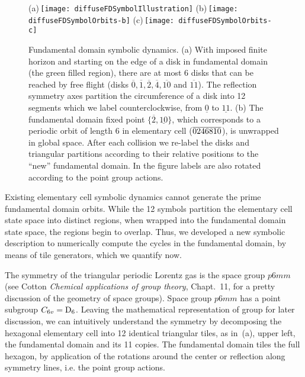 \begin{figure}[htbp]
  (a)\,\texttt{[image: diffuseFDSymbolIllustration]}
  (b)\,\texttt{[image: diffuseFDSymbolOrbits-b]}
  (c)\,\texttt{[image: diffuseFDSymbolOrbits-c]}
  \caption{\label{fig-fdflights}
  Fundamental domain symbolic dynamics.
  (a) With  imposed finite horizon and starting on the edge of a disk in
  fundamental  domain (the green filled region), there are at most 6
  disks that can be reached by free flight (disks
  $\overline{0},\overline{1},\overline{2},\overline{4},\overline{10}$ and
  $\overline{11}$).
  The reflection symmetry axes partition the circumference of
  a disk into 12 segments which we
  label counterclockwise, from $\underline{0}$ to $\underline{11}$. 
  (b) The fundamental domain fixed point
  $\{\overline{2},\underline{10}\}$, which corresponds to a periodic
  orbit of length 6 in elementary cell (${\overline{0246810}}$), is unwrapped
  in   global space. After each collision we re-label the disks and
  triangular   partitions according to their relative positions to the
  ``new'' fundamental   domain. In the figure labels are also rotated
  according to the point   group actions.
  }
\end{figure}



Existing elementary cell symbolic dynamics cannot generate the prime fundamental domain orbits. While the 12 symbols partition the elementary cell state space into distinct regions, when wrapped into the fundamental domain state space, the regions begin to overlap. Thus, we developed a new symbolic description to numerically compute the cycles in the fundamental domain, by means of tile generators, which we quantify now. 


The symmetry of the triangular periodic Lorentz gas is the space group
$p6mm$ (see Cotton {\em Chemical applications of group
theory},  Chapt.~11, for a pretty discussion of the geometry of space
groups). Space group $p6mm$ has a point subgroup $C_{6v}=\textrm{D}_{6}$. Leaving
the mathematical representation of group for later discussion, we can
intuitively understand the symmetry by decomposing the hexagonal
elementary cell into 12 identical triangular tiles, as in
\,(a), upper left, the fundamental domain and
its 11 copies. The fundamental domain tiles the full hexagon, by
application of the  rotations around the center or reflection along
symmetry lines, i.e. the point group actions.


